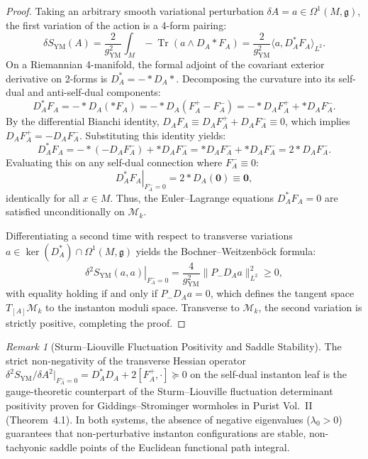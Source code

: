 \documentclass[11pt,a4paper,reqno]{article}
\theoremstyle{plain}
\theoremstyle{definition}
\theoremstyle{remark}
\newtheorem{remark}[theorem]{Remark}
\numberwithin{equation}{section}
\providecommand{\Tr}{\operatorname{Tr}}
\begin{document}
\begin{proof}
Taking an arbitrary smooth variational perturbation $\delta A = a \in \Omega^1(M, \mathfrak{g})$, the first variation of the action is a 4-form pairing:
\begin{equation}
  \delta S_{\mathrm{YM}}(A) = \frac{2}{g_{\mathrm{YM}}^2} \int_M -\Tr\left( a \wedge D_A *F_A \right) = \frac{2}{g_{\mathrm{YM}}^2} \langle a, D_A^* F_A \rangle_{L^2}.
\end{equation}
On a Riemannian 4-manifold, the formal adjoint of the covariant exterior derivative on 2-forms is $D_A^* = -* D_A *$. Decomposing the curvature into its self-dual and anti-self-dual components:
\begin{equation}
  D_A^* F_A = -* D_A (*F_A) = -* D_A (F_A^+ - F_A^-) = -* D_A F_A^+ + * D_A F_A^-.
\end{equation}
By the differential Bianchi identity, $D_A F_A \equiv D_A F_A^+ + D_A F_A^- \equiv 0$, which implies $D_A F_A^+ = -D_A F_A^-$. Substituting this identity yields:
\begin{equation}
  D_A^* F_A = -* (-D_A F_A^-) + * D_A F_A^- = * D_A F_A^- + * D_A F_A^- = 2 * D_A F_A^-.
\end{equation}
Evaluating this on any self-dual connection where $F_A^- \equiv 0$:
\begin{equation}
  \left. D_A^* F_A \right|_{F_A^- = 0} = 2 * D_A (\mathbf{0}) \equiv \mathbf{0},
\end{equation}
identically for all $x \in M$. Thus, the Euler--Lagrange equations $D_A^* F_A = 0$ are satisfied unconditionally on $\mathcal{M}_k$.

Differentiating a second time with respect to transverse variations $a \in \operatorname{ker}(D_A^*) \cap \Omega^1(M, \mathfrak{g})$ yields the Bochner--Weitzenb\"{o}ck formula:
\begin{equation}
  \left. \delta^2 S_{\mathrm{YM}}(a, a) \right|_{F_A^- = 0} = \frac{4}{g_{\mathrm{YM}}^2} \|P_- D_A a\|_{L^2}^2 \ge 0,
\end{equation}
with equality holding if and only if $P_- D_A a = 0$, which defines the tangent space $T_{[A]} \mathcal{M}_k$ to the instanton moduli space. Transverse to $\mathcal{M}_k$, the second variation is strictly positive, completing the proof.
\end{proof}

\begin{remark}[Sturm--Liouville Fluctuation Positivity and Saddle Stability]
\label{rem:sturm_liouville_positivity}
The strict non-negativity of the transverse Hessian operator $\delta^2 S_{\mathrm{YM}} / \delta A^2 |_{F_A^- = 0} = D_A^* D_A + 2[F_A^+, \cdot] \succeq 0$ on the self-dual instanton leaf is the gauge-theoretic counterpart of the Sturm--Liouville fluctuation determinant positivity proven for Giddings--Strominger wormholes in Purist Vol.~II (Theorem~4.1). In both systems, the absence of negative eigenvalues ($\lambda_0 > 0$) guarantees that non-perturbative instanton configurations are stable, non-tachyonic saddle points of the Euclidean functional path integral.
\end{remark}
\end{document}
